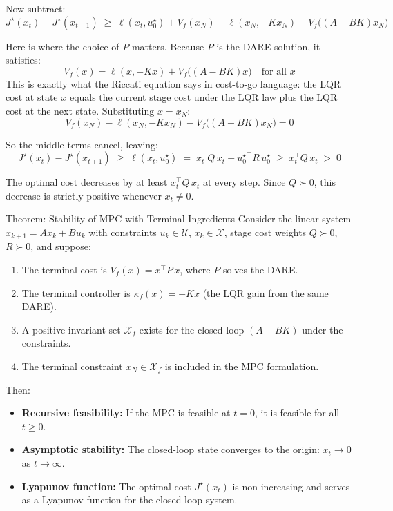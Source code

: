 Now subtract:
\[
J^\star(x_t) - J^\star(x_{t+1}) \;\ge\; \ell(x_t, u_0^\star) + V_f(x_N) - \ell(x_N, -Kx_N) - V_f\bigl((A-BK)x_N\bigr)
\]

Here is where the choice of $P$ matters. Because $P$ is the DARE solution, it satisfies:
\[
V_f(x) = \ell(x, -Kx) + V_f\bigl((A - BK)x\bigr) \quad \text{for all } x
\]
This is exactly what the Riccati equation says in cost-to-go language: the LQR cost at state $x$ equals the current stage cost under the LQR law plus the LQR cost at the next state. Substituting $x = x_N$:
\[
V_f(x_N) - \ell(x_N, -Kx_N) - V_f\bigl((A - BK)x_N\bigr) = 0
\]

So the middle terms cancel, leaving:
\[
J^\star(x_t) - J^\star(x_{t+1}) \;\ge\; \ell(x_t, u_0^\star) \;=\; x_t^\top Q\, x_t + {u_0^\star}^\top R\, u_0^\star \;\ge\; x_t^\top Q\, x_t \;>\; 0
\]

The optimal cost decreases by at least $x_t^\top Q\, x_t$ at every step. Since $Q \succ 0$, this decrease is strictly positive whenever $x_t \ne 0$.

\begin{summarybox}{Theorem: Stability of MPC with Terminal Ingredients}
	Consider the linear system $x_{k+1} = Ax_k + Bu_k$ with constraints $u_k \in \mathcal{U}$, $x_k \in \mathcal{X}$, stage cost weights $Q \succ 0$, $R \succ 0$, and suppose:
	\begin{enumerate}[noitemsep]
		\item The terminal cost is $V_f(x) = x^\top P\, x$, where $P$ solves the DARE.
		\item The terminal controller is $\kappa_f(x) = -Kx$ (the LQR gain from the same DARE).
		\item A positive invariant set $\mathcal{X}_f$ exists for the closed-loop $(A - BK)$ under the constraints.
		\item The terminal constraint $x_N \in \mathcal{X}_f$ is included in the MPC formulation.
	\end{enumerate}
	Then:
	\begin{itemize}[noitemsep]
		\item \textbf{Recursive feasibility:} If the MPC is feasible at $t = 0$, it is feasible for all $t \ge 0$.
		\item \textbf{Asymptotic stability:} The closed-loop state converges to the origin: $x_t \to 0$ as $t \to \infty$.
		\item \textbf{Lyapunov function:} The optimal cost $J^\star(x_t)$ is non-increasing and serves as a Lyapunov function for the closed-loop system.
	\end{itemize}
\end{summarybox}

